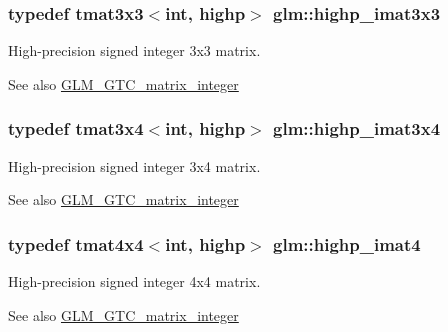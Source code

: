\subsubsection[{highp\+\_\+imat3x3}]{\setlength{\rightskip}{0pt plus 5cm}typedef tmat3x3$<$int, highp$>$ {\bf glm\+::highp\+\_\+imat3x3}}\label{group__gtc__matrix__integer_gaecb62c11fb25aadbb7eecc2da226d444}
High-\/precision signed integer 3x3 matrix. \begin{DoxySeeAlso}{See also}
\hyperlink{group__gtc__matrix__integer}{G\+L\+M\+\_\+\+G\+T\+C\+\_\+matrix\+\_\+integer} 
\end{DoxySeeAlso}
\hypertarget{group__gtc__matrix__integer_gabcd2d8d764b11db413259ee5cafd8446}{}
\subsubsection[{highp\+\_\+imat3x4}]{\setlength{\rightskip}{0pt plus 5cm}typedef tmat3x4$<$int, highp$>$ {\bf glm\+::highp\+\_\+imat3x4}}\label{group__gtc__matrix__integer_gabcd2d8d764b11db413259ee5cafd8446}
High-\/precision signed integer 3x4 matrix. \begin{DoxySeeAlso}{See also}
\hyperlink{group__gtc__matrix__integer}{G\+L\+M\+\_\+\+G\+T\+C\+\_\+matrix\+\_\+integer} 
\end{DoxySeeAlso}
\hypertarget{group__gtc__matrix__integer_gaa5eedcb20883541c3f7f2862cbd0b446}{}
\subsubsection[{highp\+\_\+imat4}]{\setlength{\rightskip}{0pt plus 5cm}typedef tmat4x4$<$int, highp$>$ {\bf glm\+::highp\+\_\+imat4}}\label{group__gtc__matrix__integer_gaa5eedcb20883541c3f7f2862cbd0b446}
High-\/precision signed integer 4x4 matrix. \begin{DoxySeeAlso}{See also}
\hyperlink{group__gtc__matrix__integer}{G\+L\+M\+\_\+\+G\+T\+C\+\_\+matrix\+\_\+integer} 
\end{DoxySeeAlso}
\hypertarget{group__gtc__matrix__integer_ga7b936ac315e12b546d2597a4bffee4a1}{}
